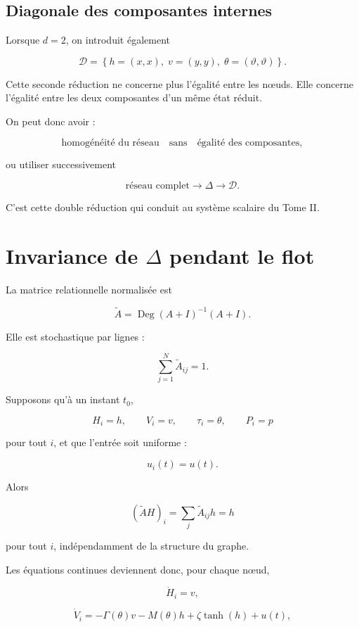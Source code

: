 \subsection{Diagonale des composantes internes}

Lorsque \(d=2\), on introduit également

\[
\mathcal D
=
\left\{
h=(x,x),\;
v=(y,y),\;
\theta=(\vartheta,\vartheta)
\right\}.
\]

Cette seconde réduction ne concerne plus l'égalité entre les nœuds.
Elle concerne l'égalité entre les deux composantes d'un même état
réduit.

On peut donc avoir :

\[
\text{homogénéité du réseau}
\quad\text{sans}\quad
\text{égalité des composantes},
\]

ou utiliser successivement

\[
\text{réseau complet}
\longrightarrow
\Delta
\longrightarrow
\mathcal D.
\]

C'est cette double réduction qui conduit au système scalaire du
Tome II.

\section{Invariance de \texorpdfstring{$\Delta$}{Delta} pendant le flot}
\label{annexe-reduction-invariance-flot}

La matrice relationnelle normalisée est

\[
\widetilde A
=
\operatorname{Deg}(A+I)^{-1}(A+I).
\]

Elle est stochastique par lignes :

\[
\sum_{j=1}^N\widetilde A_{ij}=1.
\]

Supposons qu'à un instant \(t_0\),

\[
H_i=h,\qquad
V_i=v,\qquad
\tau_i=\theta,\qquad
P_i=p
\]

pour tout \(i\), et que l'entrée soit uniforme :

\[
u_i(t)=u(t).
\]

Alors

\[
(\widetilde A H)_i
=
\sum_j\widetilde A_{ij}h
=
h
\]

pour tout \(i\), indépendamment de la structure du graphe.

Les équations continues deviennent donc, pour chaque nœud,

\[
\dot H_i=v,
\]

\[
\dot V_i
=
-\Gamma(\theta)v
-
M(\theta)h
+
\zeta\tanh(h)
+
u(t),
\]

